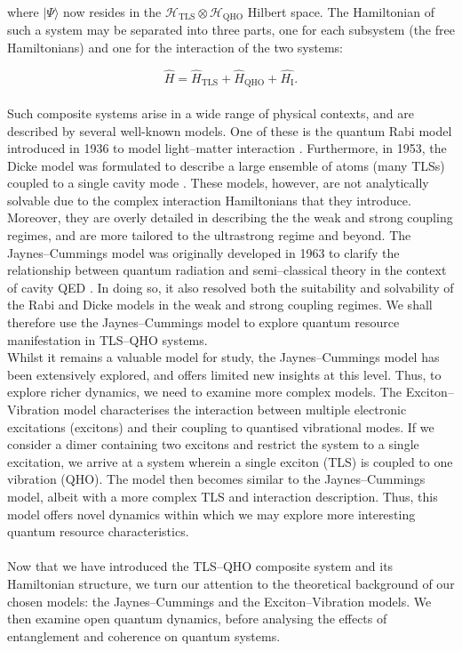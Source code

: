 \documentclass[11pt]{article}
\begin{document}
where $|\Psi\rangle$ now resides in the $\mathcal{H}_{\scriptscriptstyle \text{TLS}} \otimes\mathcal{H}_{\scriptscriptstyle \text{QHO}}$ Hilbert space. The Hamiltonian of such a system may be separated into three parts, one for each subsystem (the free Hamiltonians) and one for the interaction of the two systems:

\begin{equation}
    \hat{H} = \hat{H}_{\scriptscriptstyle \text{TLS}} + \hat{H}_{\scriptscriptstyle \text{QHO}} + \hat{H_{\scriptscriptstyle \text{I}}}.
\end{equation}
\\
Such composite systems arise in a wide range of physical contexts, and are described by several well-known models. One of these is the quantum Rabi model introduced in 1936 to model light--matter interaction \cite{Context1936-Rabi}. Furthermore, in 1953, the Dicke model was formulated to describe a large ensemble of atoms (many TLSs) coupled to a single cavity mode \cite{Context1954-Dicke}. These models, however, are not analytically solvable due to the complex interaction Hamiltonians that they introduce. Moreover, they are overly detailed in describing the the weak and strong coupling regimes, and are more tailored to the ultrastrong regime and beyond. The Jaynes--Cummings model was originally developed in 1963 to clarify the relationship between quantum radiation and semi--classical theory in the context of cavity QED \cite{Context1963-JC_Original}. In doing so, it also resolved both the suitability and solvability of the Rabi and Dicke models in the weak and strong coupling regimes. We shall therefore use the Jaynes--Cummings model to explore quantum resource manifestation in TLS--QHO systems.\\
Whilst it remains a valuable model for study, the Jaynes--Cummings model has been extensively explored, and offers limited new insights at this level. Thus, to explore richer dynamics, we need to examine more complex models. The Exciton--Vibration model characterises the interaction between multiple electronic excitations (excitons) and their coupling to quantised vibrational modes. If we consider a dimer containing two excitons and restrict the system to a single excitation, we arrive at a system wherein a single exciton (TLS) is coupled to one vibration (QHO). The model then becomes similar to the Jaynes--Cummings model, albeit with a more complex TLS and interaction description. Thus, this model offers novel dynamics within which we may explore more interesting quantum resource characteristics. \\
\\
Now that we have introduced the TLS–QHO composite system and its Hamiltonian structure, we turn our attention to the theoretical background of our chosen models: the Jaynes–Cummings and the Exciton–Vibration models. We then examine open quantum dynamics, before analysing the effects of entanglement and coherence on quantum systems.
\end{document}
